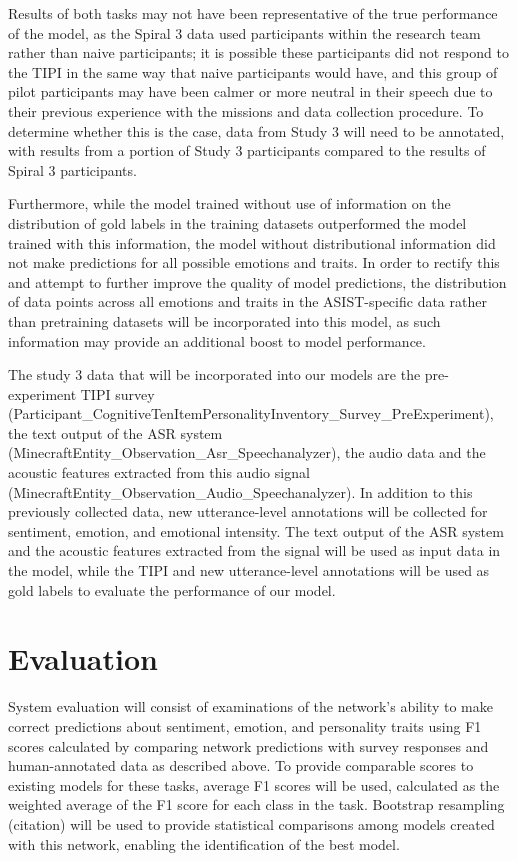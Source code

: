 Results of both tasks may not have been representative of the true performance of
the model, as the Spiral 3 data used participants within the research team rather
than naive participants; it is possible these participants did not respond to the
TIPI in the same way that naive participants would have, and this group of pilot
participants may have been calmer or more neutral in their speech due to their
previous experience with the missions and data collection procedure. To determine
whether this is the case, data from Study 3 will need to be annotated, with results
from a portion of Study 3 participants compared to the results of Spiral 3
participants.

Furthermore, while the model trained without use of information on the distribution
of gold labels in the training datasets outperformed the model trained with this
information, the model without distributional information did not make predictions
for all possible emotions and traits. In order to rectify this and attempt to
further improve the quality of model predictions, the distribution of data points
across all emotions and traits in the ASIST-specific data rather than pretraining
datasets will be incorporated into this model, as such information may provide an
additional boost to model performance.

The study 3 data that will be incorporated into our models are the
pre-experiment TIPI survey
(Participant\_CognitiveTenItemPersonalityInventory\_Survey\_PreExperiment),
the text output of the ASR system
(MinecraftEntity\_Observation\_Asr\_Speechanalyzer), the audio data and the
acoustic features extracted from this audio signal
(MinecraftEntity\_Observation\_Audio\_Speechanalyzer). In addition to this
previously collected data, new utterance-level annotations will be collected
for sentiment, emotion, and emotional intensity. The text output of the ASR
system and the acoustic features extracted from the signal will be used as
input data in the model, while the TIPI and new utterance-level annotations
will be used as gold labels to evaluate the performance of our model. 


\section{Evaluation}

System evaluation will consist of examinations of the network's ability to
make correct predictions about sentiment, emotion, and personality traits
using F1 scores calculated by comparing network predictions with survey
responses and human-annotated data as described above. To provide comparable
scores to existing models for these tasks, average F1 scores will be used,
calculated as the weighted average of the F1 score for each class in the task.
Bootstrap resampling (citation) will be used to provide statistical
comparisons among models created with this network, enabling the
identification of the best model. 

